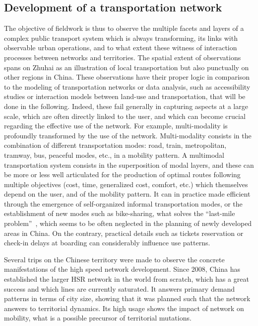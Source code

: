 \subsection{Development of a transportation network}

The objective of fieldwork is thus to observe the multiple facets and layers of a complex public transport system which is always transforming, its links with observable urban operations, and to what extent these witness of interaction processes between networks and territories. The spatial extent of observations spans on Zhuhai as an illustration of local transportation but also punctually on other regions in China. These observations have their proper logic in comparison to the modeling of transportation networks or data analysis, such as accessibility studies or interaction models between land-use and transportation, that will be done in the following. Indeed, these fail generally in capturing aspects at a large scale, which are often directly linked to the user, and which can become crucial regarding the effective use of the network. For example, multi-modality is profoundly transformed by the use of the network. Multi-modality consists in the combination of different transportation modes: road, train, metropolitan, tramway, bus, peaceful modes, etc., in a mobility pattern. A multimodal transportation system consists in the superposition of modal layers, and these can be more or less well articulated for the production of optimal routes following multiple objectives (cost, time, generalized cost, comfort, etc.) which themselves depend on the user, and of the mobility pattern. It can in practice made efficient through the emergence of self-organized informal transportation modes, or the establishment of new modes such as bike-sharing, what solves the ``last-mile problem''~\cite{liu2012solving}, which seems to be often neglected in the planning of newly developed areas in China. On the contrary, practical details such as tickets reservation or check-in delays at boarding can considerably influence use patterns.


Several trips on the Chinese territory were made to observe the concrete manifestations of the high speed network development. Since 2008, China has established the larger HSR network in the world from scratch, which has a great success and which lines are currently saturated. It answers primary demand patterns in terms of city size, showing that it was planned such that the network answers to territorial dynamics. Its high usage shows the impact of network on mobility, what is a possible precursor of territorial mutations.

